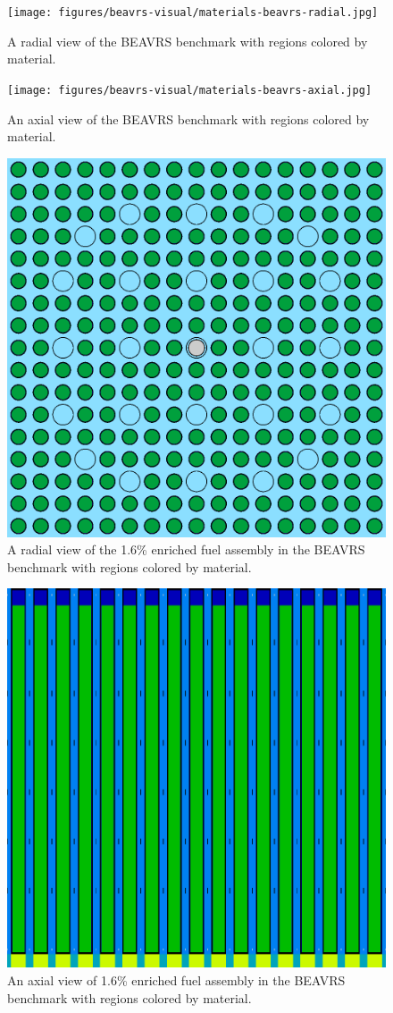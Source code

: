 \begin{figure}[h!]
	\centering
	\texttt{[image: figures/beavrs-visual/materials-beavrs-radial.jpg]}
	\caption{A radial view of the BEAVRS benchmark with regions colored by material.}
	\label{fig:beavrs-materials-radial}
\end{figure} 

\begin{figure}[h!]
	\centering
	\texttt{[image: figures/beavrs-visual/materials-beavrs-axial.jpg]}
	\caption{An axial view of the BEAVRS benchmark with regions colored by material.}
	\label{fig:beavrs-materials-axial}
\end{figure} 

\begin{figure}[h!]
	\centering
	\includegraphics[width=0.65\linewidth]{figures/beavrs-visual/materials-single-assembly-radial.png}
	\caption{A radial view of the 1.6\% enriched fuel assembly in the BEAVRS benchmark with regions colored by material.}
	\label{fig:beavrs-single-assembly-materials-radial}
\end{figure} 

\begin{figure}[h!]
	\centering
	\includegraphics[width=0.65\linewidth]{figures/beavrs-visual/materials-single-assembly-axial.png}
	\caption{An axial view of 1.6\% enriched fuel assembly in the BEAVRS benchmark with regions colored by material.}
	\label{fig:beavrs-single-assembly-materials-axial}
\end{figure} 



